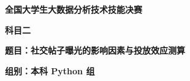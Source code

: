 \documentclass[withoutpreface,bwprint]{format}
\begin{document}
\renewcommand*{\mritekeywordslabelfont}{\song\bfseries}

\begin{titlepage}
  \centering
  \vspace*{2.4cm}

  {\bfseries 全国大学生大数据分析技术技能决赛\par}

  \vspace{1.8cm}
  {\bfseries 科目二\par}

  \vspace{3.0cm}
  {\bfseries 题目：社交帖子曝光的影响因素与投放效应测算\par}

  \vspace{1.6cm}
  {\bfseries 组别：本科 Python 组\par}

  \vfill
\end{titlepage}

\setcounter{page}{1}
\thispagestyle{plain}



\setcounter{tocdepth}{2}
\setlength{\cftbeforesecskip}{0pt}
\setlength{\cftbeforesubsecskip}{-2pt}
{\small\tableofcontents}
\newpage









\end{document}

